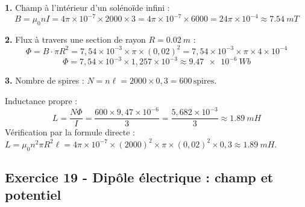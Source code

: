 \documentclass[12pt,a4paper]{article}
\begin{document}
\begin{boitecorrige}
\textbf{1.} Champ à l'intérieur d'un solénoïde infini :
\[
B = \mu_0 n I = 4\pi\times10^{-7}\times2000\times3 = 4\pi\times10^{-7}\times6000 = 24\pi\times10^{-4} \approx \qty{7.54}{mT}
\]

\textbf{2.} Flux à travers une section de rayon $R = \qty{0.02}{m}$ :
\[
\Phi = B\cdot\pi R^2 = 7{,}54\times10^{-3}\times\pi\times(0{,}02)^2 = 7{,}54\times10^{-3}\times\pi\times4\times10^{-4}
\]
\[
\Phi = 7{,}54\times10^{-3}\times1{,}257\times10^{-3} \approx \qty{9.47e-6}{Wb}
\]

\textbf{3.} Nombre de spires : $N = n\ell = 2000\times0{,}3 = 600\,\text{spires}$.

Inductance propre :
\[
L = \frac{N\Phi}{I} = \frac{600\times9{,}47\times10^{-6}}{3} = \frac{5{,}682\times10^{-3}}{3} \approx \qty{1.89}{mH}
\]
Vérification par la formule directe : $L = \mu_0 n^2\pi R^2\ell = 4\pi\times10^{-7}\times(2000)^2\times\pi\times(0{,}02)^2\times0{,}3 \approx \qty{1.89}{mH}$.
\end{boitecorrige}


\subsection*{Exercice 19 - Dipôle électrique : champ et potentiel \niveau{\difficile}}
\end{document}
